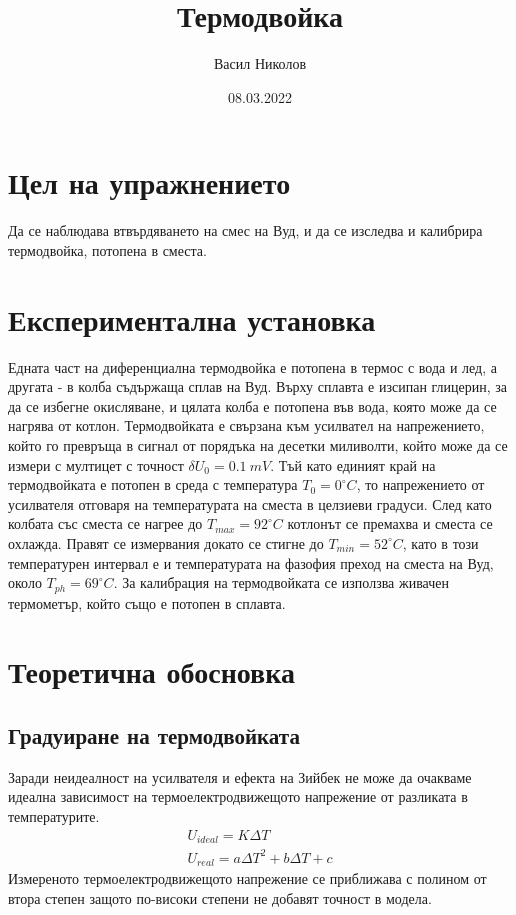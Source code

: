 \documentclass[aps, prb, twocolumn, a4paper, floatfix, reprint]{revtex4-2}
\begin{document}
\title{Термодвойка}
\author{Васил Николов}
\noaffiliation
\date{08.03.2022}
\maketitle

\section{Цел на упражнението}
Да се наблюдава втвърдяването на смес на Вуд, и да се изследва и калибрира термодвойка, потопена в сместа. 

\section{Експериментална установка}
Едната част на диференциална термодвойка е потопена в термос с вода и лед, а другата - в колба съдържаща сплав на Вуд. Върху сплавта е изсипан глицерин, за да се избегне окисляване, и цялата колба е потопена във вода, която може да се нагрява от котлон. Термодвойката е свързана към усилвател на напрежението, който го превръща в сигнал от порядъка на десетки миливолти, който може да се измери с мултицет с точност $\delta U_0 = 0.1 \ mV$. Тъй като единият край на термодвойката е потопен в среда с температура $T_0 = 0^{\circ}C$, то напрежението от усилвателя отговаря на температурата на сместа в целзиеви градуси. След като колбата със сместа се нагрее до $T_{max} = 92^{\circ} C$ котлонът се премахва и сместа се охлажда. Правят се измервания докато се стигне до $T_{min} = 52^{\circ} C$, като в този температурен интервал е и температурата на фазофия преход на сместа на Вуд, около $T_{ph} = 69^{\circ} C$. За калибрация на термодвойката се използва живачен термометър, който също е потопен в сплавта. 

\section{Теоретична обосновка}
\subsection{Градуиране на термодвойката}
Заради неидеалност на усилвателя и ефекта на Зийбек не може да очакваме идеална зависимост на термоелектродвижещото напрежение от разликата в температурите. 
\begin{gather*}
    U_{ideal} = K\Delta T \\
    U_{real} = a\Delta T^2 + b\Delta T + c
\end{gather*}
Измереното термоелектродвижещото напрежение се приближава с полином от втора степен защото по-високи степени не добавят точност в модела. 
\end{document}
